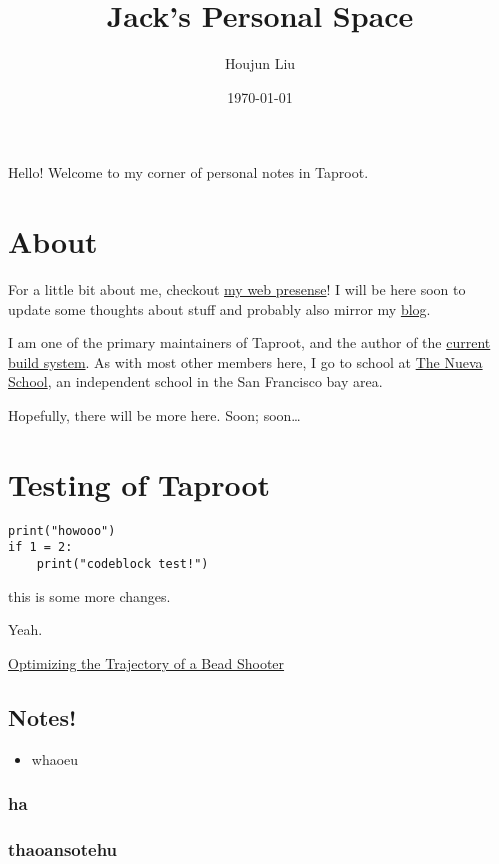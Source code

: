 \documentclass[letterpaper]{article}
\author{Houjun Liu}
\date{\today}
\title{Jack's Personal Space}
\renewcommand\maketitle{}
\begin{document}
\maketitle
Hello! Welcome to my corner of personal notes in Taproot.

\section{About}
\label{sec:org6677a5c}
For a little bit about me, checkout \href{https://www.jemoka.com/}{my web presense}! I will be here soon to update some thoughts about stuff and probably also mirror my \href{https://medium.com/20minuterants}{blog}.

I am one of the primary maintainers of Taproot, and the author of the \href{https://github.com/InSanityHQ/taproot3/}{current build system}. As with most other members here, I go to school at \href{https://www.nuevaschool.org}{The Nueva School}, an independent school in the San Francisco bay area.

Hopefully, there will be more here. Soon; soon\ldots{}


\section{Testing of Taproot}
\label{sec:org2c7780f}
\begin{verbatim}
print("howooo")
if 1 = 2:
    print("codeblock test!")
\end{verbatim}

this is some more changes.



Yeah.

\href{../../physics/advanced\_mechanics/KBhTrajectoryOptimization.org}{Optimizing the Trajectory of a Bead Shooter}


\subsection{Notes!}
\label{sec:org873da9c}
\begin{itemize}
\item whaoeu
\end{itemize}
\subsubsection{ha}
\label{sec:org44a7fa8}

\subsubsection{thaoansotehu}
\label{sec:orgff7ee21}
\end{document}
